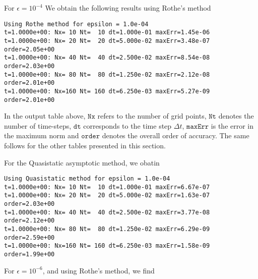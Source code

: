 \documentclass[11pt]{article}
\numberwithin{equation}{section}
\newcommand{\dt}{\Delta t}
\begin{document}
For $\epsilon = 10^{-4}$ We obtain the following results using Rothe's method
\begin{footnotesize}
\begin{Verbatim}[frame = single]
Using Rothe method for epsilon = 1.0e-04
t=1.0000e+00: Nx= 10 Nt=  10 dt=1.000e-01 maxErr=1.45e-06
t=1.0000e+00: Nx= 20 Nt=  20 dt=5.000e-02 maxErr=3.48e-07 order=2.05e+00
t=1.0000e+00: Nx= 40 Nt=  40 dt=2.500e-02 maxErr=8.54e-08 order=2.03e+00
t=1.0000e+00: Nx= 80 Nt=  80 dt=1.250e-02 maxErr=2.12e-08 order=2.01e+00
t=1.0000e+00: Nx=160 Nt= 160 dt=6.250e-03 maxErr=5.27e-09 order=2.01e+00
\end{Verbatim}
\end{footnotesize}
In the output table above, $\texttt{Nx}$ refers to the number of grid points, $\texttt{Nt}$ denotes the number of time-steps,  $\texttt{dt}$ corresponds to the time step $\dt$, $\texttt{maxErr}$ is the error in the maximum norm and $\texttt{order}$ denotes the overall order of accuracy. The same follows for the other tables presented in this section.  

For the Quasistatic asymptotic method, we obatin
\begin{footnotesize}
\begin{Verbatim}[frame = single]
Using Quasistatic method for epsilon = 1.0e-04
t=1.0000e+00: Nx= 10 Nt=  10 dt=1.000e-01 maxErr=6.67e-07
t=1.0000e+00: Nx= 20 Nt=  20 dt=5.000e-02 maxErr=1.63e-07 order=2.03e+00
t=1.0000e+00: Nx= 40 Nt=  40 dt=2.500e-02 maxErr=3.77e-08 order=2.12e+00
t=1.0000e+00: Nx= 80 Nt=  80 dt=1.250e-02 maxErr=6.29e-09 order=2.59e+00
t=1.0000e+00: Nx=160 Nt= 160 dt=6.250e-03 maxErr=1.58e-09 order=1.99e+00
\end{Verbatim}
\end{footnotesize}

For $\epsilon = 10^{-6}$, and using Rothe's method, we find
\end{document}
